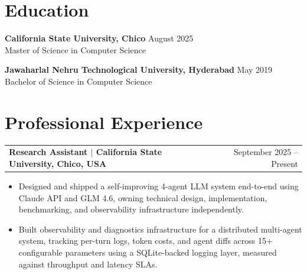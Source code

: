 \documentclass[a4paper,10.5pt]{article} %
\makeatletter
\newenvironment{joblong}[2]{
  \begin{tabularx}{\linewidth}{@{}l X r@{}}
  \textbf{#1} & & #2 \\
  \end{tabularx}
  \vspace{-15pt}
  \begin{itemize}[nosep, leftmargin=1em, itemsep=3pt,label=$\bullet$]
}{\end{itemize}}
\makeatother
\begin{document}
\section*{Education}
\textbf{California State University, Chico} \hfill August 2025 \\
Master of Science in Computer Science

\vspace{3pt}
\textbf{Jawaharlal Nehru Technological University, Hyderabad} \hfill May 2019 \\
Bachelor of Science in Computer Science


\section*{Professional Experience}

\begin{joblong}{Research Assistant $|$ California State University, Chico, USA}{September 2025 -- Present}
\item Designed and shipped a self-improving 4-agent LLM system end-to-end 
using Claude API and GLM 4.6, owning technical design, implementation, 
benchmarking, and observability infrastructure independently.
\item Built observability and diagnostics infrastructure for a distributed 
multi-agent system, tracking per-turn logs, token costs, and agent diffs 
across 15+ configurable parameters using a SQLite-backed logging layer, 
measured against throughput and latency SLAs.
\end{joblong}
\end{document}
